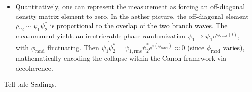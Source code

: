 \documentclass[11pt]{article}
\begin{document}
\begin{itemize}
\item 
Quantitatively, one can represent the measurement as forcing an off-diagonal density matrix element to zero. In the aether picture, the off-diagonal element $\rho_{12} \sim \psi_1 \psi_2^*$ is proportional to the overlap of the two branch waves. The measurement yields an irretrievable phase randomization $\psi_1 \to \psi_1 e^{i\phi_{\text{rand}}(t)}$, with $\phi_{\text{rand}}$ fluctuating. Then $\overline{\psi_1 \psi_2^*} = \psi_{1, \text{rms}}\psi_2^* e^{i(\phi_{\text{rand}})} \approx 0$ (since $\phi_{\text{rand}}$ varies), mathematically encoding the collapse within the Canon framework via decoherence.




\end{itemize}

Tell-tale Scalings.
\end{document}
